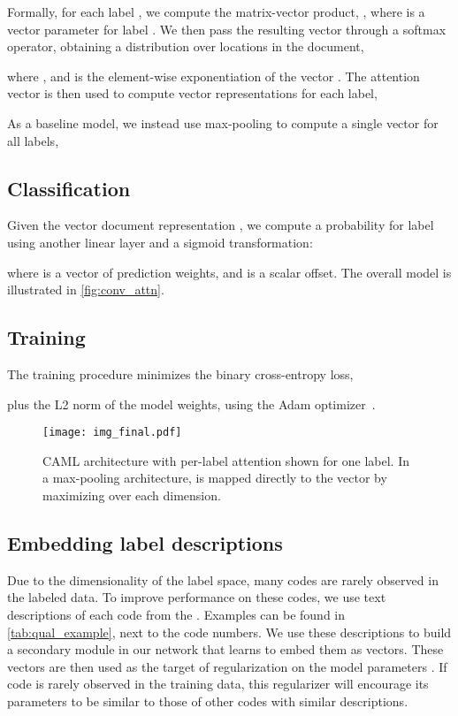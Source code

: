 \documentclass[11pt,a4paper]{article}
\begin{document}
Formally, for each label , we compute the matrix-vector product, , where  is a vector parameter for label . 
We then pass the resulting vector through a softmax operator, obtaining a distribution over locations in the document,

where , and  is the element-wise exponentiation of the vector . The attention vector  is then used to compute vector representations for each label,


As a baseline model, we instead use max-pooling to compute a single vector  for all labels,


\subsection{Classification}
Given the vector document representation , we compute a probability for label  using another linear layer and a sigmoid transformation:

where  is a vector of prediction weights, and  is a scalar offset. The overall model is illustrated in \autoref{fig:conv_attn}. 

\subsection{Training}
The training procedure minimizes the binary cross-entropy loss,

plus the L2 norm of the model weights, using the Adam optimizer~\cite{kingma2014adam}.

\begin{figure}
\centering
\texttt{[image: img\_final.pdf]}
\caption{CAML architecture with per-label attention shown for one label. In a max-pooling architecture,  is mapped directly to the vector  by maximizing over each dimension.}
\label{fig:conv_attn}
\end{figure}

\subsection{Embedding label descriptions}\label{sec:desc_embed}

Due to the dimensionality of the label space, many codes are rarely observed in the labeled data.
To improve performance on these codes, we use text descriptions of each code from the .
Examples can be found in \autoref{tab:qual_example}, next to the code numbers.
We use these descriptions to build a secondary module in our network that learns to embed 
them as vectors. These vectors are then used as the target of regularization on the model parameters . If code  is rarely observed in the training data, this regularizer will encourage its parameters to be similar to those of other codes with similar descriptions.
\end{document}
